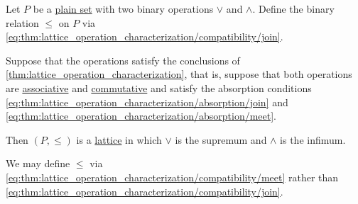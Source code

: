 \begin{proposition}\label{thm:lattice_from_binary_operations}
  Let \( P \) be a \hyperref[def:set]{plain set} with two binary operations \( \vee \) and \( \wedge \). Define the binary relation \( \leq \) on \( P \) via \eqref{eq:thm:lattice_operation_characterization/compatibility/join}.

  Suppose that the operations satisfy the conclusions of \cref{thm:lattice_operation_characterization}, that is, suppose that both operations are \hyperref[def:binary_operation/associative]{associative} and \hyperref[def:binary_operation/commutative]{commutative} and satisfy the absorption conditions \eqref{eq:thm:lattice_operation_characterization/absorption/join} and \eqref{eq:thm:lattice_operation_characterization/absorption/meet}.

  Then \( (P, \leq) \) is a \hyperref[def:lattice]{lattice} in which \( \vee \) is the supremum and \( \wedge \) is the infimum.
\end{proposition}
\begin{comments}
  \item We may define \( \leq \) via \eqref{eq:thm:lattice_operation_characterization/compatibility/meet} rather than \eqref{eq:thm:lattice_operation_characterization/compatibility/join}.
\end{comments}
